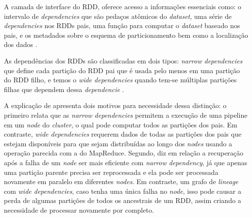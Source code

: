             A camada de interface do RDD, oferece acesso a informações essenciais como: o intervalo de \textit{dependencies}
            que são pedaços atômicos do \textit{dataset}, uma série de \textit{dependencies} nos RDDs pais, uma função para
            computar o \textit{dataset} baseado nos pais, e os metadados sobre o esquema de particionamento bem como a
            localização dos dados \cite{karau2015}.

            As dependências dos RDDs são classificadas em dois tipos: \textit{narrow dependencies} que define cada partição do RDD
            pai que é usada pelo menos em uma partição do RDD filho, e temos o \textit{wide dependencies} quando tem-se múltiplas
            partições filhas que dependem dessa \textit{dependencie} \cite{karau2015}.

            A explicação de  apresenta dois motivos para necessidade dessa distinção: o primeiro relata que
            as \textit{narrow dependencies} permitem a execução de uma pipeline em um \textit{node} do \textit{cluster}, o qual
            pode computar todos as partições dos pais. Em contraste, \textit{wide dependencies} requerem dados de todas as partições
            dos pais que estejam disponíveis para que sejam distribuídas ao longo dos \textit{nodes} usando a operação parecida com a
            do MapReduce. Segundo, diz em relação a recuperação após a falha de um \textit{node} ser mais eficiente com
            \textit{narrow dependency}, já que apenas uma partição parente precisa ser reprocessada e ela pode ser processada novamente
            em paralelo em diferentes \textit{nodes}. Em contraste, um grafo de \textit{lineage} com \textit{wide dependencies}, caso tenha
            uma única falha no \textit{node}, isso pode causar a perda de algumas partições de todos os ancestrais de um RDD, assim
            criando a necessidade de processar novamente por completo.

